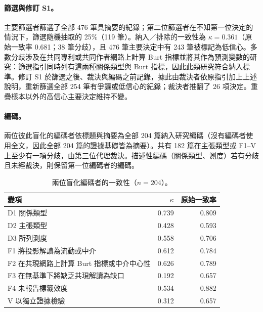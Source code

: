 \paragraph{篩選與修訂 S1。} 主要篩選者篩選了全部 476 筆具摘要的紀錄；第二位篩選者在不知第一位決定的情況下，篩選隨機抽取的 25\%（119 筆）。納入／排除的一致性為 $\kappa = 0.361$（原始一致率 0.681；38 筆分歧），且 476 筆主要決定中有 243 筆被標記為低信心。多數分歧涉及在共同專利或共同作者網路上計算 Burt 指標並將其作為預測變數的研究：篩選指引同時列有這兩種關係類型與 Burt 指標，因此此類研究符合納入標準。修訂 S1 於篩選之後、裁決與編碼之前記錄，據此由裁決者依原指引加上上述說明，重新篩選全部 254 筆有爭議或低信心的紀錄；裁決者推翻了 26 項決定。重疊樣本以外的高信心主要決定維持不變。

\paragraph{編碼。} 兩位彼此盲化的編碼者依標題與摘要為全部 204 篇納入研究編碼（沒有編碼者使用全文，因此全部 204 篇的證據基礎皆為摘要）。共有 182 篇在主張類型或 F1--V 上至少有一項分歧，由第三位代理裁決。描述性編碼（關係類型、測度）若有分歧且未經裁決，則保留第一位編碼者的編碼。

\begin{table}[htbp]
  \centering
  \caption{兩位盲化編碼者的一致性（$n = 204$）。}
  \label{zh:tab:app_review_kappa}
  \small
  \begin{tabular}{lrr}
    \toprule
    變項 & $\kappa$ & 原始一致率 \\
    \midrule
    D1 關係類型 & 0.739 & 0.809 \\
    D2 主張類型 & 0.428 & 0.593 \\
    D3 所列測度 & 0.558 & 0.706 \\
    F1 將投影解讀為流動或中介 & 0.612 & 0.784 \\
    F2 在共現網路上計算 Burt 指標或中介中心性 & 0.626 & 0.789 \\
    F3 在無基準下將缺乏共現解讀為缺口 & 0.192 & 0.657 \\
    F4 未報告標籤效度 & 0.534 & 0.882 \\
    V 以獨立證據檢驗 & 0.312 & 0.657 \\
    \bottomrule
  \end{tabular}
\end{table}

